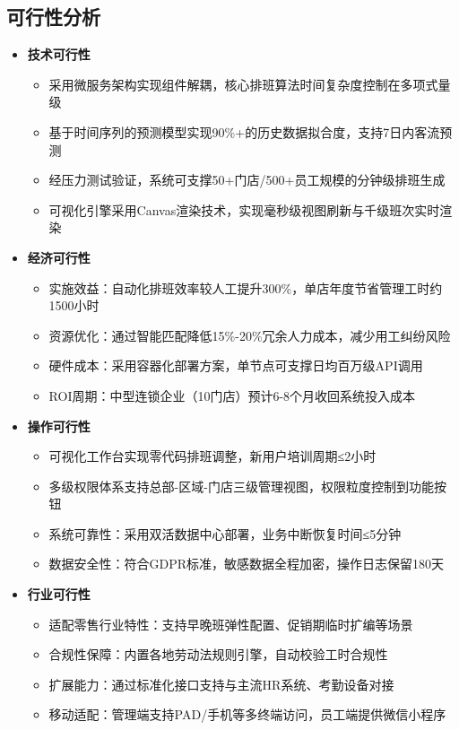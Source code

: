 \documentclass{ctexart}
\begin{document}
\subsection{可行性分析}
\begin{itemize}
    \item \textbf{技术可行性}
    \begin{itemize}
        \item 采用微服务架构实现组件解耦，核心排班算法时间复杂度控制在多项式量级
        \item 基于时间序列的预测模型实现90\%+的历史数据拟合度，支持7日内客流预测
        \item 经压力测试验证，系统可支撑50+门店/500+员工规模的分钟级排班生成
        \item 可视化引擎采用Canvas渲染技术，实现毫秒级视图刷新与千级班次实时渲染
    \end{itemize}
    
    \item \textbf{经济可行性}
    \begin{itemize}
        \item 实施效益：自动化排班效率较人工提升300\%，单店年度节省管理工时约1500小时
        \item 资源优化：通过智能匹配降低15\%-20\%冗余人力成本，减少用工纠纷风险
        \item 硬件成本：采用容器化部署方案，单节点可支撑日均百万级API调用
        \item ROI周期：中型连锁企业（10门店）预计6-8个月收回系统投入成本
    \end{itemize}
    
    \item \textbf{操作可行性}
    \begin{itemize}
        \item 可视化工作台实现零代码排班调整，新用户培训周期≤2小时
        \item 多级权限体系支持总部-区域-门店三级管理视图，权限粒度控制到功能按钮
        \item 系统可靠性：采用双活数据中心部署，业务中断恢复时间≤5分钟
        \item 数据安全性：符合GDPR标准，敏感数据全程加密，操作日志保留180天
    \end{itemize}

    \item \textbf{行业可行性}
    \begin{itemize}
        \item 适配零售行业特性：支持早晚班弹性配置、促销期临时扩编等场景
        \item 合规性保障：内置各地劳动法规则引擎，自动校验工时合规性
        \item 扩展能力：通过标准化接口支持与主流HR系统、考勤设备对接
        \item 移动适配：管理端支持PAD/手机等多终端访问，员工端提供微信小程序
    \end{itemize}
\end{itemize}
\end{document}
